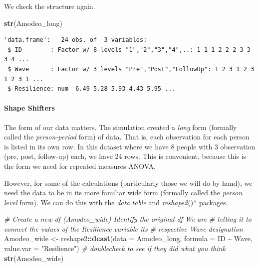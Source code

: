 \documentclass[
  11pt,
]{book}
\newenvironment{Shaded}{\begin{snugshade}}{\end{snugshade}}
\newcommand{\AttributeTok}[1]{\textcolor[rgb]{0.27,0.27,0.27}{#1}}
\newcommand{\CommentTok}[1]{\textcolor[rgb]{0.37,0.37,0.37}{\textit{#1}}}
\newcommand{\FunctionTok}[1]{\textcolor[rgb]{0.27,0.27,0.27}{\textbf{#1}}}
\newcommand{\NormalTok}[1]{#1}
\newcommand{\OtherTok}[1]{\textcolor[rgb]{0.37,0.37,0.37}{#1}}
\newcommand{\SpecialCharTok}[1]{\textcolor[rgb]{0.43,0.43,0.43}{\textbf{#1}}}
\newcommand{\StringTok}[1]{\textcolor[rgb]{0.5,0.5,0.5}{#1}}
\begin{document}
\begin{Shaded}
\end{Shaded}

We check the structure again.

\begin{Shaded}
\begin{Highlighting}[]
\FunctionTok{str}\NormalTok{(Amodeo\_long)}
\end{Highlighting}
\end{Shaded}

\begin{verbatim}
'data.frame':   24 obs. of  3 variables:
 $ ID        : Factor w/ 8 levels "1","2","3","4",..: 1 1 1 2 2 2 3 3 3 4 ...
 $ Wave      : Factor w/ 3 levels "Pre","Post","FollowUp": 1 2 3 1 2 3 1 2 3 1 ...
 $ Resilience: num  6.49 5.28 5.93 4.43 5.95 ...
\end{verbatim}

\hypertarget{shape-shifters}{%
\paragraph{Shape Shifters}\label{shape-shifters}}

The form of our data matters. The simulation created a \emph{long} form (formally called the \emph{person-period} form) of data. That is, each observation for each person is listed in its own row. In this dataset where we have 8 people with 3 observation (pre, post, follow-up) each, we have 24 rows. This is convenient, because this is the form we need for repeated measures ANOVA.

However, for some of the calculations (particularly those we will do by hand), we need the data to be in its more familiar wide form (formally called the \emph{person level} form). We can do this with the \emph{data.table} and \emph{reshape2}()* packages.

\begin{Shaded}
\begin{Highlighting}[]
\CommentTok{\# Create a new df (Amodeo\_wide) Identify the original df We are}
\CommentTok{\# telling it to connect the values of the Resilience variable its}
\CommentTok{\# respective Wave designation}
\NormalTok{Amodeo\_wide }\OtherTok{\textless{}{-}}\NormalTok{ reshape2}\SpecialCharTok{::}\FunctionTok{dcast}\NormalTok{(}\AttributeTok{data =}\NormalTok{ Amodeo\_long, }\AttributeTok{formula =}\NormalTok{ ID }\SpecialCharTok{\textasciitilde{}}\NormalTok{ Wave,}
    \AttributeTok{value.var =} \StringTok{"Resilience"}\NormalTok{)}
\CommentTok{\# doublecheck to see if they did what you think}
\FunctionTok{str}\NormalTok{(Amodeo\_wide)}
\end{Highlighting}
\end{Shaded}
\end{document}
